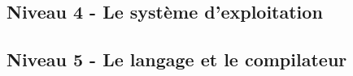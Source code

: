 \subsection{Niveau 4 - Le système d'exploitation}







\subsection{Niveau 5 - Le langage et le compilateur}




















